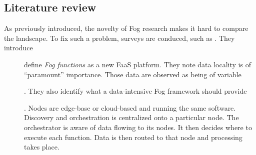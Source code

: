 \documentclass[11pt]{sdm}
\begin{document}
\subsection{Literature review}

As previously introduced, the novelty of Fog research makes it hard to compare the landscape. To fix such a problem, surveys are conduced, such as . They introduce \cite{cheng_fog_2019, baresi_paps_2019, baresi_towards_2019, cicconetti_decentralized_2021}\\ %

\begin{description}
	\item[\citet{cheng_fog_2019}] define \textit{Fog functions} as a new \gls{FaaS} platform. They note data locality is of ``paramount'' importance. Those data are observed as being of variable
	. They also identify what a data-intensive Fog framework should provide
	.
	Nodes are edge-base or cloud-based and running the same software. Discovery and orchestration is centralized onto a particular node. The orchestrator is aware of data flowing to its nodes. It then decides where to execute each function. Data is then routed to that node and processing takes place.
	

\end{description}
\end{document}
